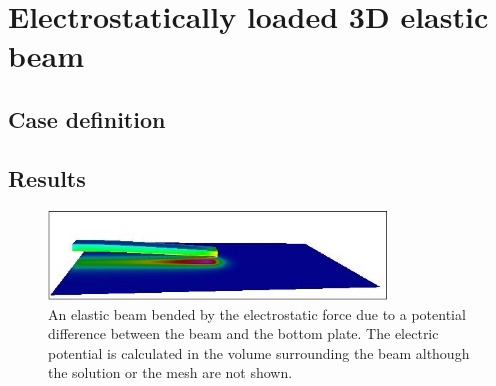 \chapter{Electrostatically loaded 3D elastic beam}


\section{Case definition}


\section{Results}

\begin{figure}[h]
  \centerline{\includegraphics[width=0.8\textwidth]{electric_force}}
  \caption{An elastic beam bended by the electrostatic force due to a
          potential difference between the beam and the bottom
          plate. The electric potential is calculated in the volume
          surrounding the beam although the solution or the mesh are
          not shown.}
\end{figure}
